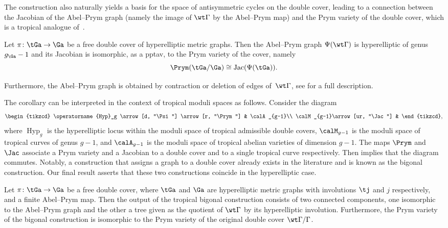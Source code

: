The construction also naturally yields a basis for the space of antisymmetric cycles on the double cover, leading to a connection between the Jacobian of the Abel--Prym graph (namely the image of $\wt\Gamma$ by the Abel--Prym map) and the Prym variety of  the double cover, which is  a tropical analogue of~\cite[Corollary 12.5.7]{BL04}. 



\begin{maincorollary}\label{mainCorollary:JacobianOfImage}
Let  $\pi\colon \tGa\to \Ga$ be a free  double cover of hyperelliptic metric graphs. Then the  Abel--Prym graph $\Psi(\wt\Gamma)$ is hyperelliptic  of genus $g_{\Ga}-1$ and its Jacobian
is isomorphic, as a pptav, to
the Prym variety of the cover, namely
    \[
    \Prym(\tGa/\Ga)\cong \mathrm{Jac}(\Psi(\tGa)).
    \]
    \end{maincorollary}

\noindent Furthermore, the Abel--Prym graph  is obtained by contraction or deletion of edges of~$\wt\Gamma$, see  for a full description. 


The corollary can be interpreted in the context of tropical moduli spaces as follows. Consider the  diagram
\[
        \begin{tikzcd}
\operatorname{Hyp}_g \arrow[d, "\Psi"] \arrow[r, "\Prym"] & \calA_{g-1}\\
\calM_{g-1}\arrow[ur, "\Jac"]                        &                  
\end{tikzcd},
\]
where $\operatorname{Hyp}_g$ is the hyperelliptic locus within the moduli space of tropical admissible double covers, $\calM_{g-1}$ is the moduli space of tropical curves of genus $g-1$, and $\calA_{g-1}$ is the moduli space of tropical abelian varieties of dimension $g-1$. 
The maps $\Prym$ and $\Jac$ associate a Prym variety and a Jacobian to a double cover and to a single tropical curve respectively. Then  implies that the diagram commutes.   Notably, a construction that  assigns a graph to a double cover already exists in the literature and is known as the bigonal construction. Our final result asserts that these two constructions coincide in the hyperelliptic case.


\begin{maintheorem}\label{mainTheorem:bigonal}
      Let $\pi\colon\tGa\to\Ga$ be a free double cover, where $\tGa$ and $\Ga$ are hyperelliptic metric graphs with involutions  $\tj$ and $j$ respectively,  and a finite Abel--Prym map. Then the output of the tropical bigonal construction consists of two connected components, one isomorphic to the Abel--Prym graph and the other a tree given as the quotient of $\wt\Gamma$ by its hyperelliptic involution. 
          Furthermore, the Prym variety of the bigonal construction is isomorphic to the Prym variety of the original double cover $\wt\Gamma/\Gamma$.
\end{maintheorem}

